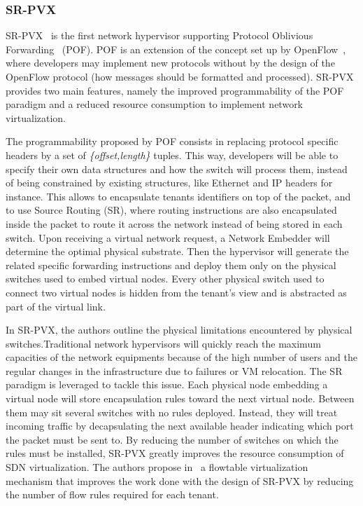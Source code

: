 \subsubsection{SR-PVX}
SR-PVX~\cite{PVX-Li2017} is the first network hypervisor supporting Protocol Oblivious Forwarding~\cite{pof-song2013} (POF). POF is an extension of the concept set up by OpenFlow~\cite{Openflow-McKeown2008}, where developers may implement new protocols without by the design of the OpenFlow protocol (\eg how messages should be formatted and processed).
SR-PVX provides two main features, namely the improved programmability of the POF paradigm and a reduced resource consumption to implement network virtualization.

The programmability proposed by POF consists in replacing protocol specific headers by a set of \textit{\{offset,length\}} tuples. This way, developers will be able to specify their own data structures and how the switch will process them, instead of being constrained by existing structures, like Ethernet and IP headers for instance. This allows to encapsulate tenants identifiers on top of the packet, and to  use Source Routing (SR), where routing instructions are also encapsulated inside the packet to route it across the network instead of being stored in each switch.
Upon receiving a virtual network request, a Network Embedder will determine the optimal physical substrate. Then the hypervisor will generate the related specific forwarding instructions and deploy them only on the physical switches used to embed virtual nodes. Every other physical switch used to connect two virtual nodes is hidden from the tenant's view and is abstracted as part of the virtual link.

In SR-PVX, the authors outline the physical limitations encountered by physical switches.Traditional network hypervisors will quickly reach the maximum capacities of the network equipments because of the high number of users and the regular changes in the infrastructure due to failures or VM relocation. The SR paradigm is leveraged to tackle this issue. Each physical node embedding a virtual node will store encapsulation rules toward the next virtual node. Between them may sit several switches with no rules deployed. Instead, they will treat incoming traffic by decapsulating the next available header indicating which port the packet must be sent to. By reducing the number of switches on which the rules must be installed, SR-PVX greatly improves the resource consumption of SDN virtualization. The authors propose in~\cite{pvflow-Li2018} a flowtable virtualization mechanism that improves the work done with the design of SR-PVX by reducing the number of flow rules required for each tenant.
    

